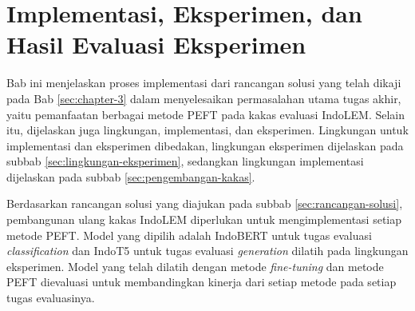\chapter{Implementasi, Eksperimen, dan Hasil Evaluasi Eksperimen}

Bab ini menjelaskan proses implementasi dari rancangan solusi yang telah dikaji pada Bab \ref{sec:chapter-3} dalam menyelesaikan permasalahan utama tugas akhir, yaitu pemanfaatan berbagai metode PEFT pada kakas evaluasi IndoLEM. Selain itu, dijelaskan juga lingkungan, implementasi, dan eksperimen. Lingkungan untuk implementasi dan eksperimen dibedakan, lingkungan eksperimen dijelaskan pada subbab \ref{sec:lingkungan-eksperimen}, sedangkan lingkungan implementasi dijelaskan pada subbab \ref{sec:pengembangan-kakas}.

Berdasarkan rancangan solusi yang diajukan pada subbab \ref{sec:rancangan-solusi}, pembangunan ulang kakas IndoLEM diperlukan untuk mengimplementasi setiap metode PEFT. Model yang dipilih adalah IndoBERT untuk tugas evaluasi \textit{classification} dan IndoT5 untuk tugas evaluasi \textit{generation} dilatih pada lingkungan eksperimen. Model yang telah dilatih dengan metode \textit{fine-tuning}  dan metode PEFT dievaluasi untuk membandingkan kinerja dari setiap metode pada setiap tugas evaluasinya.







